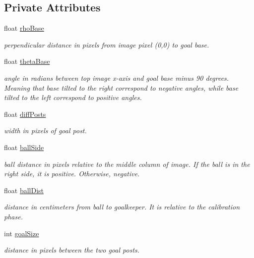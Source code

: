 \subsection*{Private Attributes}
\begin{DoxyCompactItemize}
\item 
float \hyperlink{classVS_a53922209c67146633aa44c253ddcf511}{rho\-Base}
\begin{DoxyCompactList}\small\item\em perpendicular distance in pixels from image pixel (0,0) to goal base. \end{DoxyCompactList}\item 
float \hyperlink{classVS_ae5681e223d5b1fec1e8cf7b8ebe29577}{theta\-Base}
\begin{DoxyCompactList}\small\item\em angle in radians between top image x-\/axis and goal base minus 90 degrees. Meaning that base tilted to the right correspond to negative angles, while base tilted to the left correspond to positive angles. \end{DoxyCompactList}\item 
float \hyperlink{classVS_ac744fb6e416a1d31e4385674712bb2ce}{diff\-Posts}
\begin{DoxyCompactList}\small\item\em width in pixels of goal post. \end{DoxyCompactList}\item 
float \hyperlink{classVS_a38b44df3e672879391fd65858bfac6ce}{ball\-Side}
\begin{DoxyCompactList}\small\item\em ball distance in pixels relative to the middle column of image. If the ball is in the right side, it is positive. Otherwise, negative. \end{DoxyCompactList}\item 
float \hyperlink{classVS_a29dad6f6e4e8b8c046782b4c2cefa70e}{ball\-Dist}
\begin{DoxyCompactList}\small\item\em distance in centimeters from ball to goalkeeper. It is relative to the calibration phase. \end{DoxyCompactList}\item 
int \hyperlink{classVS_a45943631ac252202008ae6c6d4a7d96e}{goal\-Size}
\begin{DoxyCompactList}\small\item\em distance in pixels between the two goal posts. \end{DoxyCompactList}\item 

\end{DoxyCompactItemize}
